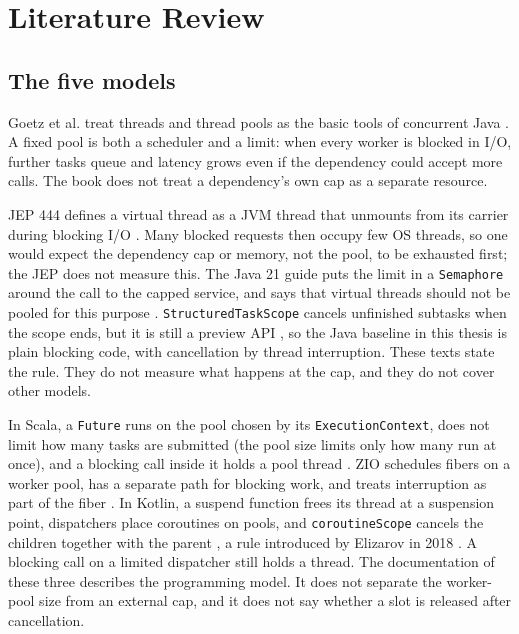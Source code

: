 \chapter{Literature Review}
\label{chap:litreview}

\section{The five models}

Goetz et al. treat threads and thread pools as the basic tools of concurrent Java \cite{ref1}. A fixed pool is both a scheduler and a limit: when every worker is blocked in I/O, further tasks queue and latency grows even if the dependency could accept more calls. The book does not treat a dependency’s own cap as a separate resource.

JEP 444 defines a virtual thread as a JVM thread that unmounts from its carrier during blocking I/O \cite{ref2}. Many blocked requests then occupy few OS threads, so one would expect the dependency cap or memory, not the pool, to be exhausted first; the JEP does not measure this. The Java 21 guide puts the limit in a \texttt{Semaphore} around the call to the capped service, and says that virtual threads should not be pooled for this purpose \cite{ref3}. \texttt{StructuredTaskScope} cancels unfinished subtasks when the scope ends, but it is still a preview API \cite{ref4}, so the Java baseline in this thesis is plain blocking code, with cancellation by thread interruption. These texts state the rule. They do not measure what happens at the cap, and they do not cover other models.

In Scala, a \texttt{Future} runs on the pool chosen by its \texttt{ExecutionContext}, does not limit how many tasks are submitted (the pool size limits only how many run at once), and a blocking call inside it holds a pool thread \cite{ref5}. ZIO schedules fibers on a worker pool, has a separate path for blocking work, and treats interruption as part of the fiber \cite{ref6}. In Kotlin, a suspend function frees its thread at a suspension point, dispatchers place coroutines on pools, and \texttt{coroutineScope} cancels the children together with the parent \cite{ref7}, a rule introduced by Elizarov in 2018 \cite{ref8}. A blocking call on a limited dispatcher still holds a thread. The documentation of these three describes the programming model. It does not separate the worker-pool size from an external cap, and it does not say whether a slot is released after cancellation.

